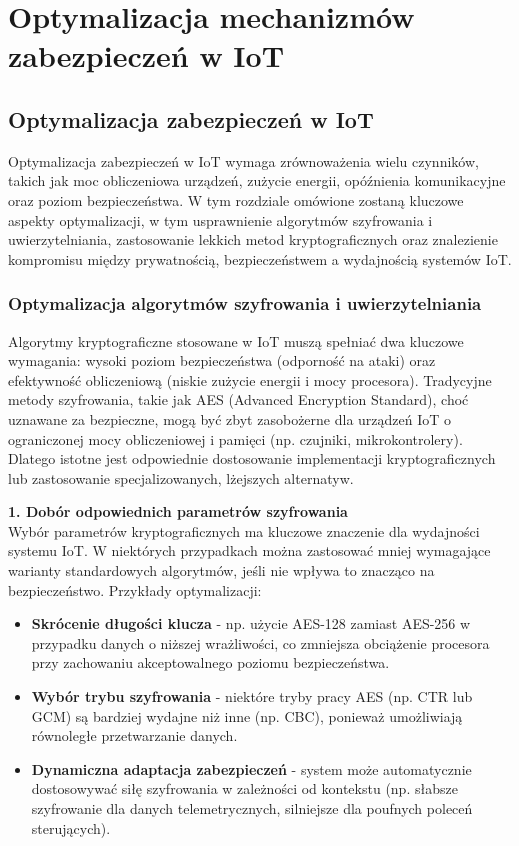 \chapter{Optymalizacja mechanizmów zabezpieczeń w IoT}
\label{chap:rozdzial7}
\section{Optymalizacja zabezpieczeń w IoT}
Optymalizacja zabezpieczeń w IoT wymaga zrównoważenia wielu czynników, takich jak moc obliczeniowa urządzeń, zużycie energii, opóźnienia komunikacyjne oraz poziom bezpieczeństwa. W tym rozdziale omówione zostaną kluczowe aspekty optymalizacji, w tym usprawnienie algorytmów szyfrowania i uwierzytelniania, zastosowanie lekkich metod kryptograficznych oraz znalezienie kompromisu między prywatnością, bezpieczeństwem a wydajnością systemów IoT.
\subsection{Optymalizacja algorytmów szyfrowania i uwierzytelniania}
Algorytmy kryptograficzne stosowane w IoT muszą spełniać dwa kluczowe wymagania: wysoki poziom bezpieczeństwa (odporność na ataki) oraz efektywność obliczeniową (niskie zużycie energii i mocy procesora). Tradycyjne metody szyfrowania, takie jak AES (Advanced Encryption Standard), choć uznawane za bezpieczne, mogą być zbyt zasobożerne dla urządzeń IoT o ograniczonej mocy obliczeniowej i pamięci (np. czujniki, mikrokontrolery). Dlatego istotne jest odpowiednie dostosowanie implementacji kryptograficznych lub zastosowanie specjalizowanych, lżejszych alternatyw.

\textbf{1. Dobór odpowiednich parametrów szyfrowania} \\
Wybór parametrów kryptograficznych ma kluczowe znaczenie dla wydajności systemu IoT. W niektórych przypadkach można zastosować mniej wymagające warianty standardowych algorytmów, jeśli nie wpływa to znacząco na bezpieczeństwo. Przykłady optymalizacji:
\begin{itemize}
    \item \textbf{Skrócenie długości klucza} - np. użycie AES-128 zamiast AES-256 w przypadku danych o niższej wrażliwości, co zmniejsza obciążenie procesora przy zachowaniu akceptowalnego poziomu bezpieczeństwa.
    \item \textbf{Wybór trybu szyfrowania} - niektóre tryby pracy AES (np. CTR lub GCM) są bardziej wydajne niż inne (np. CBC), ponieważ umożliwiają równoległe przetwarzanie danych.
    \item \textbf{Dynamiczna adaptacja zabezpieczeń} - system może automatycznie dostosowywać siłę szyfrowania w zależności od kontekstu (np. słabsze szyfrowanie dla danych telemetrycznych, silniejsze dla poufnych poleceń sterujących).
\end{itemize}

